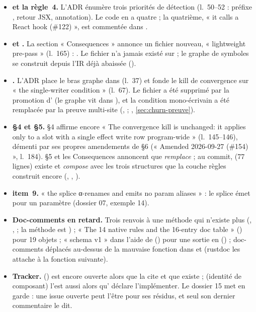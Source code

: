 \begin{itemize}
\item \textbf{ et la règle~4.} L'ADR énumère trois priorités de détection (l.~50--52 : préfixe , retour JSX, annotation). Le code en a quatre ; la quatrième, « it calls a React hook (\#122) », est commentée dans .
\item \textbf{ et .} La section « Consequences » annonce un fichier nouveau, « lightweight pre-pass » (l.~165) : . Le fichier n'a jamais existé sur  ; le graphe de symboles se construit depuis l'IR déjà abaissée ().
\item \textbf{.} L'ADR place le bras graphe dans  (l.~37) et fonde le kill de convergence sur « the single-writer condition » (l.~67). Le fichier a été supprimé par la promotion d' (le graphe vit dans ), et la condition mono-écrivain a été remplacée par la preuve multi-site (,  ; , \cref{sec:churn-preuve}).
\item \textbf{ §4 et §5.} §4 affirme encore « The convergence kill is unchanged: it applies only to a slot with a single effect write row program-wide » (l.~145--146), démenti par ses propres amendements de §6 (« Amended 2026-09-27 (\#154) », l.~184). §5 et les Consequences annoncent que  \emph{remplace}  ; au commit,  (77 lignes) existe et  \emph{compose}  avec les trois structures que la couche règles construit encore (, , ).
\item \textbf{ item~9.} « the splice α-renames and emits no param aliases » : le splice émet  pour un paramètre (dossier 07, exemple 14).
\item \textbf{Doc-comments en retard.} Trois renvois à une méthode  qui n'existe plus (, ,  ; la méthode est ) ; « The 14 native rules and the 16-entry doc table » () pour 19 objets  ; « schema v1 » dans l'aide de  () pour une sortie en  () ; doc-comments déplacés au-dessus de la mauvaise fonction dans  et  (rustdoc les attache à la fonction suivante).
\item \textbf{Tracker.}  () est encore ouverte alors que  la cite et que  existe ;  (identité de composant) l'est aussi alors qu' déclare l'implémenter. Le dossier 15 met en garde : une issue ouverte peut l'être pour ses résidus, et seul son dernier commentaire le dit.
\end{itemize}

